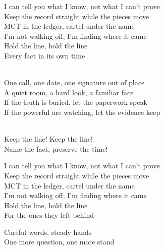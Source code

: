 \begin{lyrics}
I can tell you what I know, not what I can’t prove\\
Keep the record straight while the pieces move\\
MCT in the ledger, cartel under the name\\
I’m not walking off; I’m finding where it came\\
Hold the line, hold the line\\
Every fact in its own time

\\
One call, one date, one signature out of place\\
A quiet room, a hard look, a familiar face\\
If the truth is buried, let the paperwork speak\\
If the powerful are watching, let the evidence keep

\\
Keep the line! Keep the line!\\
Name the fact, preserve the time!

I can tell you what I know, not what I can’t prove\\
Keep the record straight while the pieces move\\
MCT in the ledger, cartel under the name\\
I’m not walking off; I’m finding where it came\\
Hold the line, hold the line\\
For the ones they left behind

Careful words, steady hands\\
One more question, one more stand
\end{lyrics}

